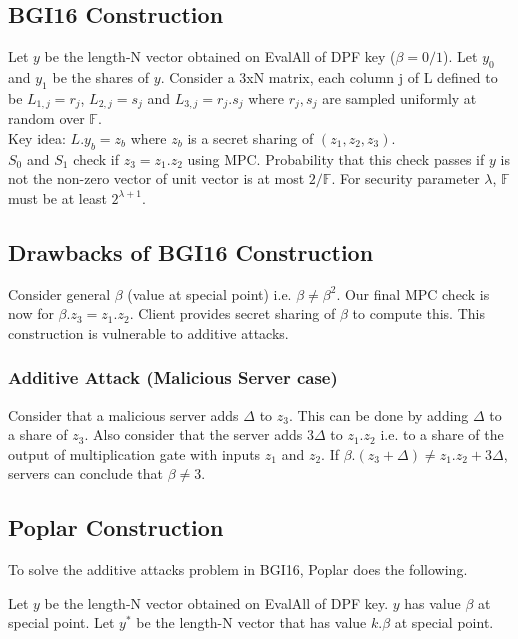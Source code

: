 \subsection{BGI16 Construction}
Let $y$ be the length-N vector obtained on EvalAll of DPF key ($\beta=0/1$). Let $y_0$ and $y_1$ be the shares of $y$. Consider a 3xN matrix, each column j of L defined to be $L_{1, j} = r_j$, $L_{2, j} = s_j$ and $L_{3, j} = r_j.s_j$ where $r_j, s_j$ are sampled uniformly at random over $\mathbb{F}$. \\

Key idea: $L.y_b = z_b$ where $z_b$ is a secret sharing of $(z_1, z_2, z_3)$. \\

$S_0$ and $S_1$ check if $z_3 = z_1.z_2$ using MPC. Probability that this check passes if $y$ is not the non-zero vector of unit vector is at most $2/\mathbb{F}$. For security parameter $\lambda$, $\mathbb{F}$ must be at least $2^{\lambda+1}$.

\subsection{Drawbacks of BGI16 Construction}
Consider general $\beta$ (value at special point) i.e. $\beta \neq \beta^2$. Our final MPC check is now for $\beta.z_3 = z_1.z_2$. Client provides secret sharing of $\beta$ to compute this. This construction is vulnerable to additive attacks.

\subsubsection{Additive Attack (Malicious Server case)}
Consider that a malicious server adds $\Delta$ to $z_3$. This can be done by adding $\Delta$ to a share of $z_3$. Also consider that the server adds $3\Delta$ to $z_1.z_2$ i.e. to a share of the output of multiplication gate with inputs $z_1$ and $z_2$. If $\beta.(z_3+\Delta) \neq z_1.z_2 + 3\Delta$, servers can conclude that $\beta \neq 3$. 

\subsection{Poplar Construction}
To solve the additive attacks problem in BGI16, Poplar does the following.

Let $y$ be the length-N vector obtained on EvalAll of DPF key. $y$ has value $\beta$ at special point. Let $y^*$ be the length-N vector that has value $k.\beta$ at special point.

